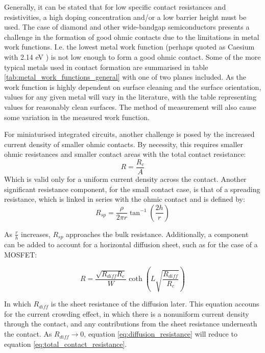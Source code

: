 Generally, it can be stated that for low specific contact resistances and resistivities, a high doping concentration and/or a low barrier height must be used. The case of diamond and other wide-bandgap semiconductors presents a challenge in the formation of good ohmic contacts due to the limitations in metal work functions. I.e. the lowest metal work function (perhaps quoted as Caesium with 2.14 \si{\electronvolt}  \cite{tipler:1992}) is not low enough to form a good ohmic contact. Some of the more typical metals used in contact formation are summarised in table \ref{tab:metal_work_functions_general} with one of two planes included. As the work function is highly dependent on surface cleaning and the surface orientation, values for any given metal will vary in the literature, with the table representing values for reasonably clean surfaces. The method of measurement will also cause some variation in the measured work function.

For miniaturised integrated circuits, another challenge is posed by the increased current density of smaller ohmic contacts. By necessity, this requires smaller ohmic resistances and smaller contact areas with the total contact resistance:
\begin{equation}
    R = \frac{R_{c}}{A}
    \label{eq:total_contact_resistance}
\end{equation}
Which is valid only for a uniform current density across the contact. Another significant resistance component, for the small contact case, is that of a spreading resistance, which is linked in series with the ohmic contact and is defined by:
\begin{equation}
    R_{sp}=\frac{\rho}{2\pi r}\tan^{-1}\left(\frac{2h}{r}\right)
    \label{eq:spreading_resistance}
\end{equation}

As $\frac{r}{h}$ increases, $R_{sp}$ approaches the bulk resistance. Additionally, a component can be added to account for a horizontal diffusion sheet, such as for the case of a MOSFET:

\begin{equation}
    R = \frac{\sqrt{R_{diff}R_{c}}}{W}\coth\left(L\sqrt{\frac{R_{diff}}{R_{c}}}\right)
    \label{eq:diffusion_resistance}
\end{equation}

In which $R_{diff}$ is the sheet resistance of the diffusion later. This equation accouns for the current crowding effect, in which there is a nonuniform current density through the contact, and any contributions from the sheet resistance underneath the contact. As $R_{diff} \rightarrow0$, equation \ref{eq:diffusion_resistance} will reduce to equation \ref{eq:total_contact_resistance}.

